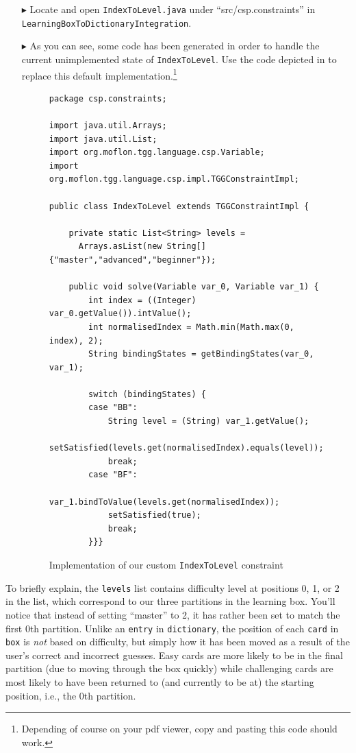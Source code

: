 \begin{itemize}
\item[$\blacktriangleright$] Locate and open \texttt{IndexToLevel.java} under ``src/csp.constraints'' in \texttt{LearningBoxToDictionaryIntegration}.

\item[$\blacktriangleright$] As you can see, some code has been generated in order to handle the current unimplemented state of \texttt{IndexToLevel}. 
Use the code depicted in  to replace this default implementation.\footnote{Depending of course on your pdf viewer, copy and pasting this code should work.}

\begin{figure}[htb]
\begin{verbatim}
package csp.constraints;

import java.util.Arrays;
import java.util.List;
import org.moflon.tgg.language.csp.Variable;
import org.moflon.tgg.language.csp.impl.TGGConstraintImpl;

public class IndexToLevel extends TGGConstraintImpl {

    private static List<String> levels = 
      Arrays.asList(new String[] {"master","advanced","beginner"});

    public void solve(Variable var_0, Variable var_1) {
        int index = ((Integer) var_0.getValue()).intValue();
        int normalisedIndex = Math.min(Math.max(0, index), 2);
        String bindingStates = getBindingStates(var_0, var_1);
        
        switch (bindingStates) {
        case "BB":
            String level = (String) var_1.getValue();
            setSatisfied(levels.get(normalisedIndex).equals(level));
            break;
        case "BF":
            var_1.bindToValue(levels.get(normalisedIndex));
            setSatisfied(true);
            break;
        }}}
\end{verbatim}
  \caption{Implementation of our custom \texttt{IndexToLevel} constraint}
  \label{code:indexToLevel}
\end{figure}

\end{itemize}

To briefly explain, the \texttt{levels} list contains difficulty level at positions 0, 1, or 2 in the list, which correspond to our three partitions in the learning box. 
You'll notice that instead of setting ``master'' to 2, it has rather been set to match the first 0th partition. 
Unlike an \texttt{entry} in \texttt{dictionary}, the position of each \texttt{card} in \texttt{box} is \emph{not} based on difficulty, but simply how it has been moved as a result of the user's correct and incorrect guesses. 
Easy cards are more likely to be in the final partition (due to moving through the box quickly) while challenging cards are most likely to have been returned to (and currently to be at) the starting position, i.e., the 0th partition.

